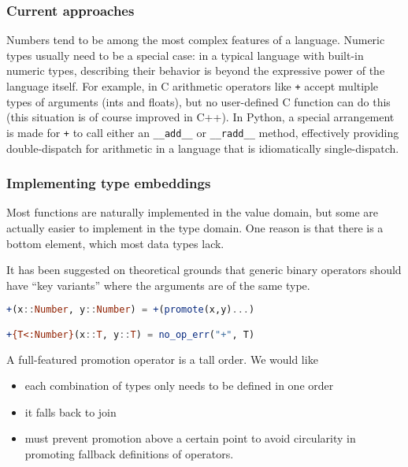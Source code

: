 \subsubsection{Current approaches}

Numbers tend to be among the most
complex features of a language. Numeric types usually need to be a special
case: in a typical language with built-in numeric types, describing their
behavior is beyond the expressive power of the language itself. For example,
in C arithmetic operators like \texttt{+} accept multiple types of arguments
(ints and floats), but no user-defined C function can do this (this situation
is of course improved in C++). In Python, a special arrangement is made for
\texttt{+} to call either an \texttt{\_\_add\_\_} or \texttt{\_\_radd\_\_} method,
effectively providing double-dispatch for arithmetic in a language that is
idiomatically single-dispatch.


\subsubsection{Implementing type embeddings}

Most functions are naturally implemented in the value domain, but some are
actually easier to implement in the type domain. One reason is that there
is a bottom element, which most data types lack.

It has been suggested on theoretical grounds \cite{categorytheoryoperators}
that generic binary operators should have ``key variants'' where the
arguments are of the same type.

\begin{singlespace}
\begin{lstlisting}[language=julia]
+(x::Number, y::Number) = +(promote(x,y)...)

+{T<:Number}(x::T, y::T) = no_op_err("+", T)

\end{lstlisting}
\end{singlespace}


A full-featured promotion operator is a tall order. We would like

\begin{itemize}
\item each combination of types only needs to be defined in one order
\item it falls back to join
\item must prevent promotion above a certain point to avoid circularity in
  promoting fallback definitions of operators.
\end{itemize}

